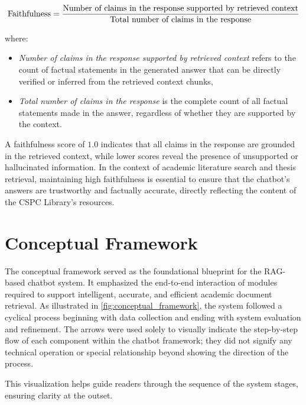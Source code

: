 \begin{refsection}
\begin{equation}
\centering
\text{Faithfulness} = \frac{\text{Number of claims in the response supported by retrieved context}}{\text{Total number of claims in the response}}
\end{equation}

where:
\begin{itemize}
\item \textit{Number of claims in the response supported by retrieved context} refers to the count of factual statements in the generated answer that can be directly verified or inferred from the retrieved context chunks,
\item \textit{Total number of claims in the response} is the complete count of all factual statements made in the answer, regardless of whether they are supported by the context.
\end{itemize}

A faithfulness score of $1.0$ indicates that all claims in the response are grounded in the retrieved context, while lower scores reveal the presence of unsupported or hallucinated information. In the context of academic literature search and thesis retrieval, maintaining high faithfulness is essential to ensure that the chatbot's answers are trustworthy and factually accurate, directly reflecting the content of the CSPC Library's resources.


\section{Conceptual Framework}

The conceptual framework served as the foundational blueprint for the RAG-based chatbot system. It emphasized the end-to-end interaction of modules required to support intelligent, accurate, and efficient academic document retrieval. As illustrated in \ref{fig:conceptual_framework}, the system followed a cyclical process beginning with data collection and ending with system evaluation and refinement.
The arrows were used solely to visually indicate the step-by-step flow of each component within the chatbot framework; they did not signify any technical operation or special relationship beyond showing the direction of the process. 

This visualization helps guide readers through the sequence of the system stages, ensuring clarity at the outset.


\end{refsection}
